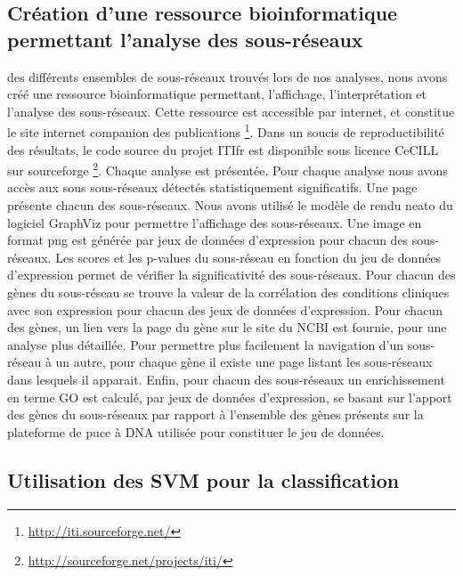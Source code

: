 		\subsection{\textcolor{green!45!black}{Création d'une ressource bioinformatique permettant l'analyse des sous-réseaux}}
			 des différents ensembles de sous-réseaux trouvés lors de nos analyses, nous avons créé une ressource bioinformatique permettant, l'affichage, l'interprétation et l'analyse des sous-réseaux.
			Cette ressource est accessible par internet, et constitue le site internet companion des publications \footnote{\url{http://iti.sourceforge.net/}}.
			Dans un soucis de reproductibilité des résultats, le code source du projet \ac{ITIfr} est disponible sous licence CeCILL sur sourceforge \footnote{\url{http://sourceforge.net/projects/iti/}}.
			Chaque analyse est présentée.
			Pour chaque analyse nous avons accès aux sous sous-réseaux détectés statistiquement significatifs.
			Une page présente chacun des sous-réseaux.
			Nous avons utilisé le modèle de rendu neato du logiciel GraphViz pour permettre l'affichage des sous-réseaux.
			Une image en format png est générée par jeux de données d'expression pour chacun des sous-réseaux.
			Les scores et les p-values du sous-réseau en fonction du jeu de données d'expression permet de vérifier la significativité des sous-réseaux.
			Pour chacun des gènes du sous-réseau se trouve la valeur de la corrélation des conditions cliniques avec son expression pour chacun des jeux de données d'expression.
			Pour chacun des gènes, un lien vers la page du gène sur le site du NCBI est fournie, pour une analyse plus détaillée.
			Pour permettre plus facilement la navigation d'un sous-réseau à un autre, pour chaque gène il existe une page listant les sous-réseaux dans lesquels il apparait.
			Enfin, pour chacun des sous-réseaux un enrichissement en terme GO est calculé, par jeux de données d'expression, se basant sur l'apport des gènes du sous-réseaux par rapport à l'ensemble des gènes présents sur la plateforme de puce à \acs{DNA} utilisée pour constituer le jeu de données.

			\pagebreak

		\subsection{\textcolor{green!45!black}{Utilisation des SVM pour la classification}}\label{sub:classification}

